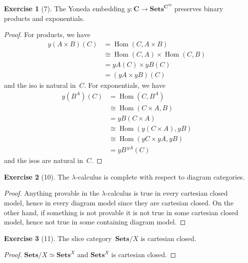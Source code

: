 \documentclass[letterpaper,12pt]{article}
\newcommand{\iso}{\cong}
\newcommand{\eqv}{\simeq}
\DeclareMathOperator{\Hom}{Hom}
\newcommand{\cat}[1]{\mathbf{#1}}
\newcommand{\dual}[1]{#1^{\mathrm{op}}}
\newcommand{\C}{\cat{C}}
\newcommand{\Cop}{\dual{\C}}
\newcommand{\Sets}{\cat{Sets}}
\newcommand{\SetsCop}{\Sets^{\Cop}}
\theoremstyle{definition}
\newtheorem*{exer}{Exercise}
\theoremstyle{remark}
\theoremstyle{direction}
\begin{document}
\begin{exer}[7]
The Yoneda embedding \(y:\C\to\SetsCop\) preserves binary products and exponentials.
\end{exer}
\begin{proof}
For products, we have
\begin{align*}
y(A\times B)(C)&=\Hom(C,A\times B)\\
	&\iso\Hom(C,A)\times\Hom(C,B)\\
	&=yA(C)\times yB(C)\\
	&=(yA\times yB)(C)
\end{align*}
and the iso is natural in~\(C\). For exponentials, we have
\begin{align*}
y(B^A)(C)&=\Hom(C,B^A)\\
	&\iso\Hom(C\times A,B)\\
	&=yB(C\times A)\\
	&\iso\Hom(y(C\times A),yB)\\
	&\iso\Hom(yC\times yA,yB)\\
	&=yB^{\,yA}(C)
\end{align*}
and the isos are natural in~\(C\).
\end{proof}

\begin{exer}[10]
The \(\lambda\)-calculus is complete with respect to diagram categories.
\end{exer}
\begin{proof}
Anything provable in the \(\lambda\)-calculus is true in every cartesian closed model, hence in every diagram model since they are cartesian closed. On the other hand, if something is not provable it is not true in some cartesian closed model, hence not true in some containing diagram model.
\end{proof}

\begin{exer}[11]
The slice category~\(\Sets/X\) is cartesian closed.
\end{exer}
\begin{proof}
\(\Sets/X\eqv\Sets^X\) and \(\Sets^X\) is cartesian closed.
\end{proof}
\end{document}
